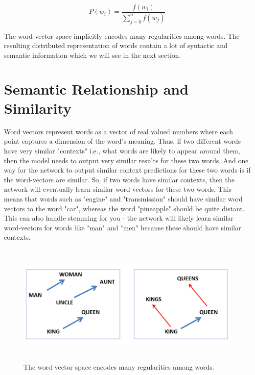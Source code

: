 \begin{equation}
P(w_{i}) = \frac{f(w_{i})}{\sum_{j=0}^{n}f(w_{j})}
\end{equation}

The word vector space implicitly encodes many regularities among words. The resulting distributed representation of words contain a lot of syntactic and semantic information which we will see in the next section.

\section{Semantic Relationship and Similarity}

Word vectors represent words as a vector of real valued numbers where each point captures a dimension of the word's meaning. Thus, if two different words have very similar "contexts" i.e., what words are likely to appear around them, then the model needs to output very similar results for these two words. And one way for the network to output similar context predictions for these two words is if the word-vectors are similar. So, if two words have similar contexts, then the network will eventually learn similar word vectors for these two words. This means that words such as "engine" and "transmission" should have similar word vectors to the word "car", whereas the word "pineapple" should be quite distant. This can also handle stemming for you - the network will likely learn similar word-vectors for words like "man" and "men" because these should have similar contexts.


\begin{figure}[htbp]
\centering
\includegraphics[width=12cm, height=6cm]{images/wv-similarities.PNG}
\centering
\caption{The word vector space encodes many regularities among words.}
\label{fig:foo}
\end{figure}

